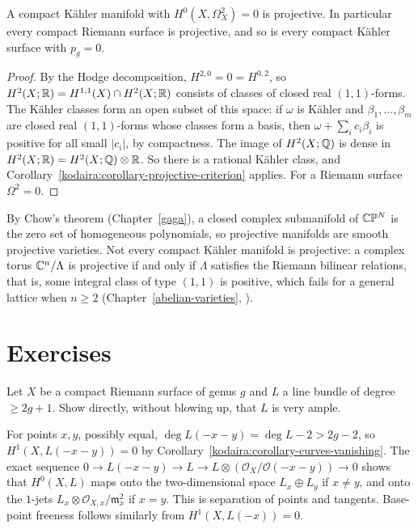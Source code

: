 \begin{corollary}\label{kodaira:corollary-h20-zero}
A compact K\"ahler manifold with $H^0(X, \Omega^2_X) = 0$ is projective. In particular every compact Riemann surface is projective, and so is
every compact K\"ahler surface with $p_g = 0$.
\end{corollary}

\begin{proof}
By the Hodge decomposition, $H^{2,0} = 0 = H^{0,2}$, so $H^2(X; \mathbb{R}) = H^{1,1}(X) \cap H^2(X; \mathbb{R})$ consists of classes of closed real $(1,1)$-forms.
The K\"ahler classes form an open subset of this space: if $\omega$ is K\"ahler and $\beta_1, \ldots, \beta_m$ are closed real $(1,1)$-forms whose
classes form a basis, then $\omega + \sum_ic_i\beta_i$ is positive for all small $|c_i|$, by compactness. The image of $H^2(X; \mathbb{Q})$ is dense in
$H^2(X; \mathbb{R}) = H^2(X; \mathbb{Q}) \otimes \mathbb{R}$. So there is a rational K\"ahler class, and Corollary~\ref{kodaira:corollary-projective-criterion} applies.
For a Riemann surface $\Omega^2 = 0$.
\end{proof}

\begin{remark}\label{kodaira:remark-chow-tori}
By Chow's theorem (Chapter~\ref{gaga}), a closed complex submanifold of $\mathbb{C}\mathbb{P}^N$ is the zero set of homogeneous polynomials, so projective
manifolds are smooth projective varieties. Not every compact K\"ahler manifold is projective: a complex torus $\mathbb{C}^n/\Lambda$ is projective if
and only if $\Lambda$ satisfies the Riemann bilinear relations, that is, some integral class of type $(1,1)$ is positive, which fails for a
general lattice when $n \geq 2$ (Chapter~\ref{abelian-varieties}, \cite{birkenhake-lange}).
\end{remark}

\section{Exercises}\label{kodaira:section-exercises}

\begin{exercise}\label{kodaira:exercise-curves-very-ample}
Let $X$ be a compact Riemann surface of genus $g$ and $L$ a line bundle of degree $\geq 2g + 1$. Show directly, without blowing up, that $L$ is very
ample.
\end{exercise}

\begin{solution}
For points $x, y$, possibly equal, $\deg L(-x-y) = \deg L - 2 > 2g - 2$, so $H^1(X, L(-x-y)) = 0$ by Corollary~\ref{kodaira:corollary-curves-vanishing}.
The exact sequence $0 \to L(-x-y) \to L \to L \otimes (\mathcal{O}_X/\mathcal{O}(-x-y)) \to 0$ shows that $H^0(X, L)$ maps onto the two-dimensional
space $L_x \oplus L_y$ if $x \neq y$, and onto the $1$-jets $L_x \otimes \mathcal{O}_{X,x}/\mathfrak{m}_x^2$ if $x = y$. This is separation of points and tangents.
Base-point freeness follows similarly from $H^1(X, L(-x)) = 0$.
\end{solution}

